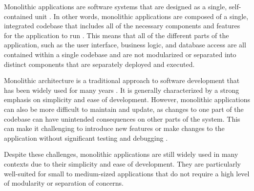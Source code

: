 Monolithic applications are software systems that are designed as a single,
self-contained unit \cite{gos2020comparison}. In other words, monolithic
applications are composed of a single, integrated codebase that includes all of
the necessary components and features for the application to run
\cite{kazanavivcius2019migrating}. This means that all of the different parts
of the application, such as the user interface, business logic, and database
access are all contained within a single codebase and are not modularized or
separated into distinct components that are separately deployed and executed.

Monolithic architecture is a traditional approach to software development that
has been widely used for many years \cite{gos2020comparison}. It is generally
characterized by a strong emphasis on simplicity and ease of development.
However, monolithic applications can also be more difficult to maintain and
update, as changes to one part of the codebase can have unintended consequences
on other parts of the system. This can make it challenging to introduce new
features or make changes to the application without significant testing and
debugging \cite{kazanavivcius2019migrating}.

Despite these challenges, monolithic applications are still widely used in many
contexts due to their simplicity and ease of development. They are particularly
well-suited for small to medium-sized applications that do not require a high
level of modularity or separation of concerns.

